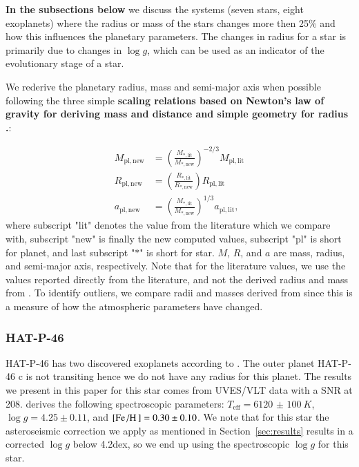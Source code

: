 \documentclass{aa}
\begin{document}
{\bf In the subsections below} we discuss the systems (seven stars, eight
exoplanets) where the radius or mass of the stars changes more then 25\% and how
this influences the planetary parameters. The changes in radius for a star is
primarily due to changes in $\log g$, which can be used as an indicator of the
evolutionary stage of a star.

We rederive the planetary radius, mass and semi-major axis when possible
following the three simple {\bf scaling relations based on Newton's law of
gravity \citep{Newton1687} for deriving mass and distance and simple geometry
for radius \citep[see e.g.][]{Torres2008}.}:

\begin{align}
    M_\mathrm{pl,new} &= \left(\frac{M_\mathrm{\ast,lit}}{M_\mathrm{\ast,new}}\right)^{-2/3} M_\mathrm{pl,lit}  \\
    R_\mathrm{pl,new} &= \left(\frac{R_\mathrm{\ast,lit}}{R_\mathrm{\ast,new}}\right) R_\mathrm{pl,lit} \\
    a_\mathrm{pl,new} &= \left(\frac{M_\mathrm{\ast,lit}}{M_\mathrm{\ast,new}}\right)^{1/3} a_\mathrm{pl,lit},
\end{align}
where subscript "lit" denotes the value from the literature which we compare
with, subscript "new" is finally the new computed values, subscript "pl" is
short for planet, and last subscript "$\ast$" is short for star. $M$, $R$, and
$a$ are mass, radius, and semi-major axis, respectively. Note that for the
literature values, we use the values reported directly from the literature, and
not the derived radius and mass from \citet{Torres2010}. To identify outliers,
we compare radii and masses derived from \citet{Torres2010} since this is a
measure of how the atmospheric parameters have changed.

\subsubsection{HAT-P-46}
\label{sub:HAT-P-46}
HAT-P-46 has two discovered exoplanets according to \citet{Hartmann2014}. The
outer planet HAT-P-46 c is not transiting hence we do not have any radius for
this planet. The results we present in this paper for this star comes from
UVES/VLT data with a SNR at 208. \citet{Hartmann2014} derives the following
spectroscopic parameters: $T_\mathrm{eff}=\SI{6120(100)}{K}$, $\log
g=4.25\pm0.11$, and $[\ion{Fe}/\ion{H}]=0.30\pm0.10$. We note that for this star
the asteroseismic correction we apply as mentioned in Section~\ref{sec:results}
results in a corrected $\log g$ below 4.2dex, so we end up using the
spectroscopic $\log g$ for this star.
\end{document}
